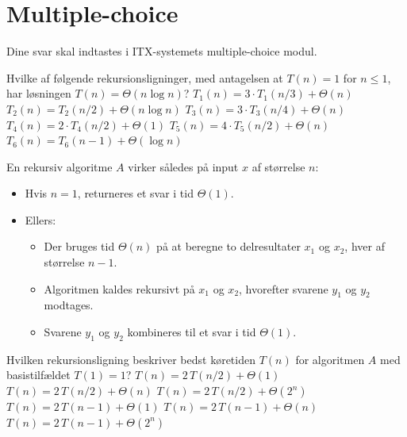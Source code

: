 \section*{Multiple-choice}\label{sec:mc}

Dine svar skal indtastes i ITX-systemets multiple-choice modul.

\multiplechoicestart

Hvilke af følgende rekursionsligninger, med antagelsen at $T(n)=1$ for $n\leq 1$, har løsningen $T(n)=\Theta(n \log n)$? \fleresvar
\mulighederstart
\svar $T_1(n) = 3\cdot T_1(n/3) + \Theta(n)$ \korrekt
\svar $T_2(n) = T_2(n/2) + \Theta(n \log n)$ \korrekt
\svar $T_3(n) = 3\cdot T_3(n/4) + \Theta(n)$
\svar $T_4(n) = 2\cdot T_4(n/2) + \Theta(1)$
\svar $T_5(n) = 4\cdot T_5(n/2) + \Theta(n)$
\svar $T_6(n) = T_6(n-1) + \Theta(\log n)$ \korrekt
\mulighederslut
{}

En rekursiv algoritme \(A\) virker således på input \(x\) af størrelse \(n\):
\begin{itemize}
  \item Hvis \(n=1\), returneres et svar i tid \(\Theta(1)\).
  \item Ellers:
  \begin{itemize}
    \item Der bruges tid \(\Theta(n)\) på at beregne to delresultater \(x_1\) og \(x_2\), hver af størrelse \(n-1\).
    \item Algoritmen kaldes rekursivt på \(x_1\) og \(x_2\), hvorefter svarene \(y_1\) og \(y_2\) modtages.
    \item Svarene \(y_1\) og \(y_2\) kombineres til et svar i tid \(\Theta(1)\).
  \end{itemize}
\end{itemize}
Hvilken rekursionsligning beskriver bedst køretiden \(T(n)\) for algoritmen \(A\) med basistilfældet \(T(1)=1\)?
\etsvar
\mulighederstart
\svar \(T(n)=2\,T(n/2)+\Theta(1)\)
\svar \(T(n)=2\,T(n/2)+\Theta(n)\)
\svar \(T(n)=2\,T(n/2)+\Theta(2^n)\)
\svar \(T(n)=2\,T(n-1)+\Theta(1)\)
\svar \(T(n)=2\,T(n-1)+\Theta(n)\) \korrekt
\svar \(T(n)=2\,T(n-1)+\Theta(2^n)\)
\mulighederslut
{}

